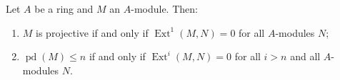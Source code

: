 Let $A$ be a ring and $M$ an $A$-module. Then:
\begin{enumerate}
\item[(a)] $M$ is projective if and only if $\operatorname{Ext}^1(M, N) = 0$ for all $A$-modules $N$;
\item[(b)] $\operatorname{pd}(M) \leq n$ if and only if $\operatorname{Ext}^i(M, N) = 0$ for all $i > n$ and all $A$-modules $N$.
\end{enumerate}
